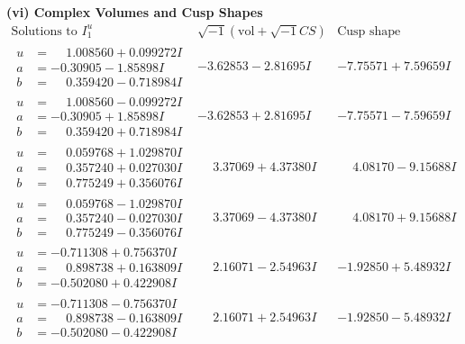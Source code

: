 \documentclass[1p]{elsarticle_modified}
\theoremstyle{definition}
\newcommand{\I}{\sqrt{-1}}
\begin{document}
\newpage\flushleft \textbf{(vi) Complex Volumes and Cusp Shapes}
$$\begin{array}{c|c|c}  
\text{Solutions to }I^u_{1}& \I (\text{vol} + \sqrt{-1}CS) & \text{Cusp shape}\\
 \hline 
\begin{aligned}
u &= \phantom{-}1.008560 + 0.099272 I \\
a &= -0.30905 - 1.85898 I \\
b &= \phantom{-}0.359420 - 0.718984 I\end{aligned}
 & -3.62853 - 2.81695 I & -7.75571 + 7.59659 I \\ \hline\begin{aligned}
u &= \phantom{-}1.008560 - 0.099272 I \\
a &= -0.30905 + 1.85898 I \\
b &= \phantom{-}0.359420 + 0.718984 I\end{aligned}
 & -3.62853 + 2.81695 I & -7.75571 - 7.59659 I \\ \hline\begin{aligned}
u &= \phantom{-}0.059768 + 1.029870 I \\
a &= \phantom{-}0.357240 + 0.027030 I \\
b &= \phantom{-}0.775249 + 0.356076 I\end{aligned}
 & \phantom{-}3.37069 + 4.37380 I & \phantom{-}4.08170 - 9.15688 I \\ \hline\begin{aligned}
u &= \phantom{-}0.059768 - 1.029870 I \\
a &= \phantom{-}0.357240 - 0.027030 I \\
b &= \phantom{-}0.775249 - 0.356076 I\end{aligned}
 & \phantom{-}3.37069 - 4.37380 I & \phantom{-}4.08170 + 9.15688 I \\ \hline\begin{aligned}
u &= -0.711308 + 0.756370 I \\
a &= \phantom{-}0.898738 + 0.163809 I \\
b &= -0.502080 + 0.422908 I\end{aligned}
 & \phantom{-}2.16071 - 2.54963 I & -1.92850 + 5.48932 I \\ \hline\begin{aligned}
u &= -0.711308 - 0.756370 I \\
a &= \phantom{-}0.898738 - 0.163809 I \\
b &= -0.502080 - 0.422908 I\end{aligned}
 & \phantom{-}2.16071 + 2.54963 I & -1.92850 - 5.48932 I \\ \hline\begin{aligned}

\end{aligned}
\end{array}$$
\end{document}
